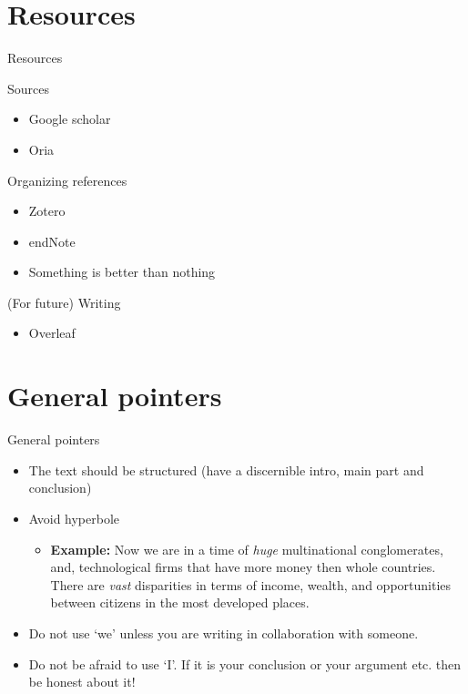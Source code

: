 \documentclass{beamer}
\begin{document}
\section{Resources}

\begin{frame}{Resources}

	Sources
	\begin{itemize}
		\item Google scholar \pause
		\item Oria \pause
	\end{itemize}
	
	Organizing references
	\begin{itemize}
		\item Zotero \pause
		\item endNote \pause
		\item Something is better than nothing \pause
	\end{itemize}

	(For future) Writing
	\begin{itemize}
		\item  Overleaf \pause
	\end{itemize}

\end{frame}

\section{General pointers}

\begin{frame}{General pointers}

	\begin{itemize}
		\item The text should be structured (have a discernible intro,
			main part and conclusion) \pause
		\item Avoid hyperbole 
			\begin{itemize}
				\item \textbf{Example:} Now we are in a time of
					\textit{huge} multinational
					conglomerates, and, technological firms
					that have more money then whole
					countries. There are \textit{vast}
					disparities in terms of income, wealth,
					and opportunities between citizens in
					the most developed places.  \pause
			\end{itemize}
		\item Do not use `we' unless you are writing in collaboration
			with someone.
		\item Do not be afraid to use `I'. If it is your conclusion or
			your argument etc. then be honest about it!
	\end{itemize}

\end{frame}
\end{document}
